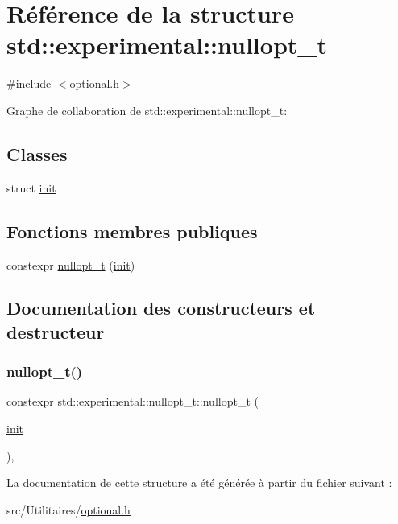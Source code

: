 \hypertarget{structstd_1_1experimental_1_1nullopt__t}{}\section{Référence de la structure std\+:\+:experimental\+:\+:nullopt\+\_\+t}
\label{structstd_1_1experimental_1_1nullopt__t}


{\ttfamily \#include $<$optional.\+h$>$}



Graphe de collaboration de std\+:\+:experimental\+:\+:nullopt\+\_\+t\+:
\subsection*{Classes}
\begin{DoxyCompactItemize}
\item 
struct \hyperlink{structstd_1_1experimental_1_1nullopt__t_1_1init}{init}
\end{DoxyCompactItemize}
\subsection*{Fonctions membres publiques}
\begin{DoxyCompactItemize}
\item 
constexpr \hyperlink{structstd_1_1experimental_1_1nullopt__t_a70943f47c66aea7fa3c15facd6617dc1}{nullopt\+\_\+t} (\hyperlink{structstd_1_1experimental_1_1nullopt__t_1_1init}{init})
\end{DoxyCompactItemize}


\subsection{Documentation des constructeurs et destructeur}
\mbox{\label{structstd_1_1experimental_1_1nullopt__t_a70943f47c66aea7fa3c15facd6617dc1}} 
\subsubsection{\texorpdfstring{nullopt\+\_\+t()}{nullopt\_t()}}
{\footnotesize\ttfamily constexpr std\+::experimental\+::nullopt\+\_\+t\+::nullopt\+\_\+t (\begin{DoxyParamCaption}\item[{\hyperlink{structstd_1_1experimental_1_1nullopt__t_1_1init}{init}}]{ }\end{DoxyParamCaption})\hspace{0.3cm}{\ttfamily [inline]}, {\ttfamily [explicit]}}



La documentation de cette structure a été générée à partir du fichier suivant \+:\begin{DoxyCompactItemize}
\item 
src/\+Utilitaires/\hyperlink{optional_8h}{optional.\+h}\end{DoxyCompactItemize}
